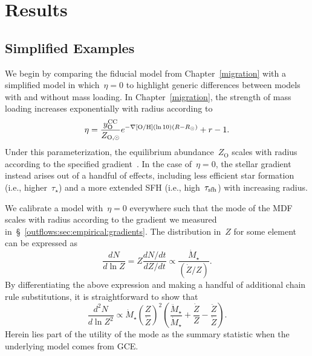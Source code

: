 
\section{Results}
\label{outflows:sec:results}

\subsection{Simplified Examples}
\label{outflows:sec:simplified-example}

We begin by comparing the fiducial model from Chapter~\ref{migration} with a
simplified model in which~$\eta = 0$ to highlight generic differences between
models with and without mass loading.
In Chapter~\ref{migration}, the strength of mass loading increases
exponentially with radius according to
\begin{equation}
\eta = \frac{y_\text{O}^\text{CC}}{Z_{\text{O},\odot}}
e^{-\nabla\text{[O/H]} (\ln 10) (R - R_\odot)} + r - 1.
\end{equation}
Under this parameterization, the equilibrium abundance~$Z_\text{O}$ scales with
radius according to the specified gradient~.
In the case of~$\eta = 0$, the stellar gradient instead arises out of a handful
of effects, including less efficient star formation (i.e., higher~$\tau_\star$)
and a more extended SFH (i.e., high~$\tau_\text{sfh}$) with increasing radius.
\par
We calibrate a model with~$\eta = 0$ everywhere such that the mode of the MDF
scales with radius according to the gradient we measured
in~\S~\ref{outflows:sec:empirical:gradients}.
The distribution in~$Z$ for some element can be expressed as
\begin{equation}
\frac{dN}{d \ln Z} = Z \frac{dN / dt}{dZ / dt}
\propto \frac{\dot{M}_\star}{(\dot{Z} / Z)}.
\end{equation}
By differentiating the above expression and making a handful of additional
chain rule substitutions, it is straightforward to show that
\begin{equation}
\frac{d^2N}{d \ln Z^2} \propto \dot{M}_\star
\left(\frac{Z}{\dot{Z}}\right)^2
\left(
\frac{\ddot{M}_\star}{\dot{M}_\star} + \frac{\dot{Z}}{Z} -
\frac{\ddot{Z}}{\dot{Z}}
\right).
\end{equation}
Herein lies part of the utility of the mode as the summary statistic when the
underlying model comes from GCE.








